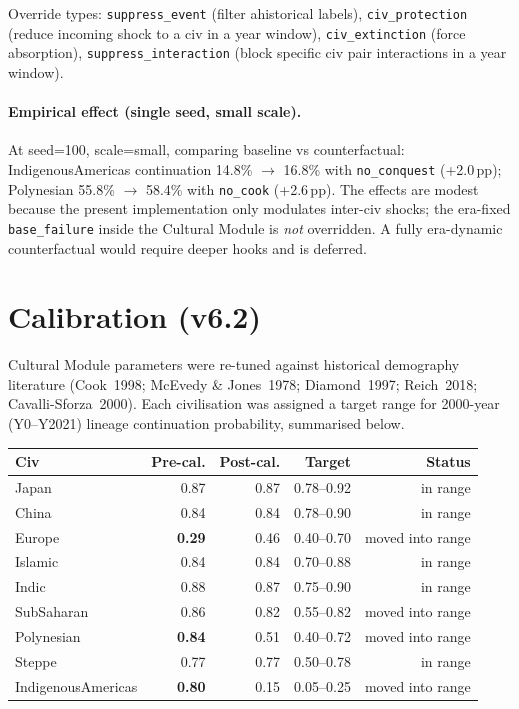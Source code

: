 Override types: \texttt{suppress\_event} (filter ahistorical
labels), \texttt{civ\_protection} (reduce incoming shock to a
civ in a year window), \texttt{civ\_extinction} (force absorption),
\texttt{suppress\_interaction} (block specific civ pair
interactions in a year window).

\paragraph{Empirical effect (single seed, small scale).}
At seed=100, scale=small, comparing baseline vs counterfactual:
IndigenousAmericas continuation 14.8\% $\to$ 16.8\% with
\texttt{no\_conquest} (+2.0\,pp); Polynesian 55.8\% $\to$ 58.4\%
with \texttt{no\_cook} (+2.6\,pp). The effects are modest because
the present implementation only modulates inter-civ shocks; the
era-fixed \texttt{base\_failure} inside the Cultural Module is
\emph{not} overridden. A fully era-dynamic counterfactual would
require deeper hooks and is deferred.

\section{Calibration (v6.2)}
\label{sec:calibration-v62}

Cultural Module parameters were re-tuned against historical
demography literature (Cook~1998; McEvedy \& Jones~1978;
Diamond~1997; Reich~2018; Cavalli-Sforza~2000). Each civilisation
was assigned a target range for 2000-year (Y0--Y2021) lineage
continuation probability, summarised below.

\begin{center}
\begin{tabular}{lrrrr}
\toprule
Civ & Pre-cal. & Post-cal. & Target & Status \\
\midrule
Japan & 0.87 & 0.87 & 0.78--0.92 & in range \\
China & 0.84 & 0.84 & 0.78--0.90 & in range \\
Europe & \textbf{0.29} & 0.46 & 0.40--0.70 & moved into range \\
Islamic & 0.84 & 0.84 & 0.70--0.88 & in range \\
Indic & 0.88 & 0.87 & 0.75--0.90 & in range \\
SubSaharan & 0.86 & 0.82 & 0.55--0.82 & moved into range \\
Polynesian & \textbf{0.84} & 0.51 & 0.40--0.72 & moved into range \\
Steppe & 0.77 & 0.77 & 0.50--0.78 & in range \\
IndigenousAmericas & \textbf{0.80} & 0.15 & 0.05--0.25 & moved into range \\
\bottomrule
\end{tabular}
\end{center}

